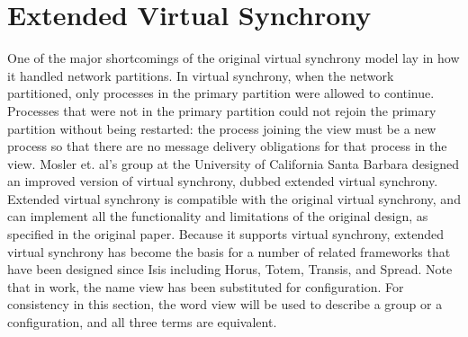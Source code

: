 \section{Extended Virtual Synchrony}
One of the major shortcomings of the original virtual synchrony model lay in how it handled network partitions. In virtual synchrony, when the network partitioned, only processes in the primary partition were allowed to continue. Processes that were not in the primary partition could not rejoin the primary partition without being restarted: the process joining the view must be a new process so that there are no message delivery obligations for that process in the view.
Mosler et. al's group at the University of California Santa Barbara\cite{EXTENDEDVIRTUALSYNCHRONY} designed an improved version of virtual synchrony, dubbed extended virtual synchrony. Extended virtual synchrony is compatible with the original virtual synchrony, and can implement all the functionality and limitations of the original design, as specified in the original paper. Because it supports virtual synchrony, extended virtual synchrony has become the basis for a number of related frameworks that have been designed since Isis including Horus, Totem, Transis, and Spread.
Note that in \cite{EXTENDEDVIRTUALSYNCHRONY} work, the name view has been substituted for configuration. For consistency in this section, the word view will be used to describe a group or a configuration, and all three terms are equivalent.

